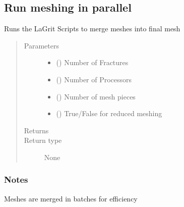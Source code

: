 \documentclass[letterpaper,10pt,english]{sphinxmanual}
\begin{document}
\subsection{Run meshing in parallel}
\label{\detokenize{pydfnworks:module-pydfnworks.dfnGen.run_meshing}}\label{\detokenize{pydfnworks:run-meshing-in-parallel}}\label{\detokenize{pydfnworks:module-run_meshing.py}}

\begin{fulllineitems}
\label{\detokenize{pydfnworks:pydfnworks.dfnGen.run_meshing.merge_the_meshes}}
Runs the LaGrit Scripts to merge meshes into final mesh
\begin{quote}\begin{description}
\item[{Parameters}] \leavevmode\begin{itemize}
\item {} 
 () \textendash{} Number of Fractures

\item {} 
 () \textendash{} Number of Processors

\item {} 
 () \textendash{} Number of mesh pieces

\item {} 
 () \textendash{} True/False for reduced meshing

\end{itemize}

\item[{Returns}] \leavevmode


\item[{Return type}] \leavevmode
None

\end{description}\end{quote}
\subsubsection*{Notes}

Meshes are merged in batches for efficiency

\end{fulllineitems}
\end{document}
